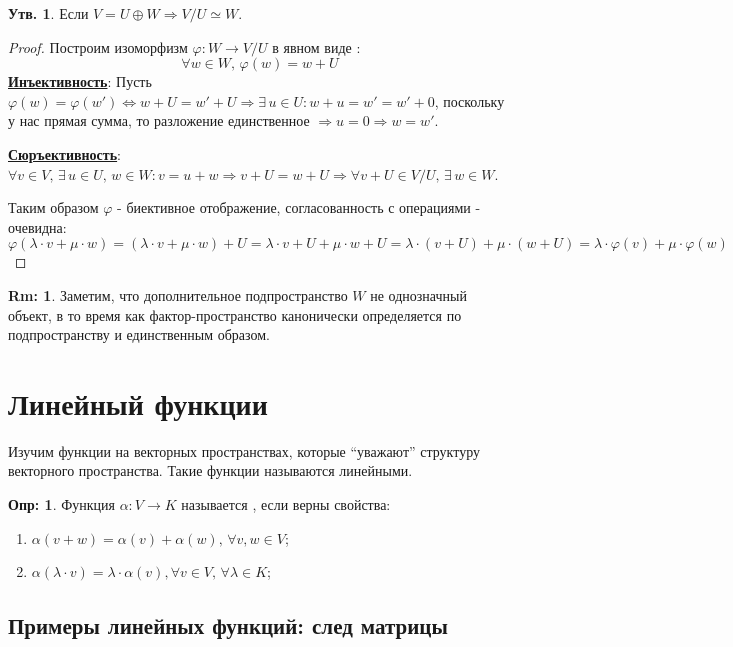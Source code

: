 \documentclass[12pt]{article}
\theoremstyle{definition}
\newtheorem{defn}{Опр:}
\newtheorem{rem}{Rm:}
\newtheorem{prop}{Утв.}
\begin{document}
\begin{prop}
	Если $V = U \oplus W \Rightarrow V/U \simeq W$.
\end{prop}
\begin{proof}
	Построим изоморфизм $\varphi \colon W \to V / U$ в явном виде :
	$$
		\forall w \in W, \, \varphi(w) = w + U
	$$
	\textbf{\uline{Инъективность}}: Пусть $\varphi(w) = \varphi(w') \Leftrightarrow w + U = w' + U \Rightarrow \exists \, u \in U \colon w + u = w' = w' + 0$, поскольку у нас прямая сумма, то разложение единственное $\Rightarrow u = 0 \Rightarrow w = w'$.
	
	\textbf{\uline{Сюръективность}}: $\forall v \in V, \, \exists \, u \in U, \, w \in W \colon v = u + w \Rightarrow v + U = w + U \Rightarrow \forall v + U \in V/U, \, \exists \, w \in W$.
	
	Таким образом $\varphi$ - биективное отображение, согласованность с операциями - очевидна:
	$$
		\varphi(\lambda {\cdot} v + \mu{\cdot} w) = (\lambda{\cdot} v + \mu {\cdot}w) + U = \lambda{\cdot} v + U + \mu{\cdot} w + U = \lambda{\cdot}(v + U) + \mu{\cdot}(w + U) = \lambda {\cdot}\varphi(v) + \mu {\cdot}\varphi(w)
	$$
\end{proof}
\begin{rem}
	Заметим, что дополнительное подпространство $W$ не однозначный объект, в то время как фактор-пространство канонически определяется по подпространству и единственным образом.
\end{rem}
\newpage
\section*{Линейный функции}
Изучим функции на векторных пространствах, которые ``уважают'' структуру векторного пространства. Такие функции называются линейными.
\begin{defn}
	Функция $\alpha \colon V \to K$ называется , если верны свойства:
	\begin{enumerate}[label=(\arabic*)]
		\item $\alpha(v + w) = \alpha(v) + \alpha(w), \, \forall v,w \in V$;
		\item $\alpha(\lambda{\cdot}v) = \lambda{\cdot}\alpha(v), \forall v\in V, \, \forall \lambda \in K$;
	\end{enumerate}
\end{defn}

\subsection*{Примеры линейных функций: след матрицы}
\end{document}
